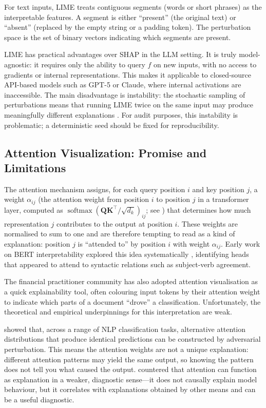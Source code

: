 For text inputs, LIME treats contiguous segments (words or short phrases) as the
interpretable features. A segment is either ``present'' (the original text) or ``absent''
(replaced by the empty string or a padding token). The perturbation space is the set of
binary vectors indicating which segments are present.

LIME has practical advantages over SHAP in the LLM setting. It is truly model-agnostic:
it requires only the ability to query $f$ on new inputs, with no access to gradients or
internal representations. This makes it applicable to closed-source API-based models
such as GPT-5 or Claude, where internal activations are inaccessible. The main
disadvantage is instability: the stochastic sampling of perturbations means that running
LIME twice on the same input may produce meaningfully different explanations
\cite{arrieta2020explainable}. For audit purposes, this instability is problematic; a
deterministic seed should be fixed for reproducibility.

\subsection{Attention Visualization: Promise and Limitations}
\label{sec:ch12-attention-visualization}

The attention mechanism \cite{vaswani2017attention} assigns, for each query position $i$
and key position $j$, a weight $\alpha_{ij}$ (the attention weight from position $i$ to position $j$ in a transformer layer, computed as $\operatorname{softmax}(\mathbf{Q}\mathbf{K}^\top/\sqrt{d_k})_{ij}$; see ) that determines how much representation $j$
contributes to the output at position $i$. These weights are normalised to sum to one
and are therefore tempting to read as a kind of explanation: position $j$ is ``attended
to'' by position $i$ with weight $\alpha_{ij}$. Early work on BERT interpretability
explored this idea systematically \cite{clark2019bert}, identifying heads that
appeared to attend to syntactic relations such as subject-verb agreement.

The financial practitioner community has also adopted attention visualisation as a quick
explainability tool, often colouring input tokens by their attention weight to indicate
which parts of a document ``drove'' a classification. Unfortunately, the theoretical
and empirical underpinnings for this interpretation are weak.

\citet{jain2019attention} showed that, across a range of NLP classification tasks,
alternative attention distributions that produce identical predictions can be constructed
by adversarial perturbation. This means the attention weights are not a unique
explanation: different attention patterns may yield the same output, so knowing the
pattern does not tell you what caused the output. \citet{wiegreffe2019attention}
countered that attention can function as explanation in a weaker, diagnostic sense---it
does not causally explain model behaviour, but it correlates with explanations obtained
by other means and can be a useful diagnostic.

